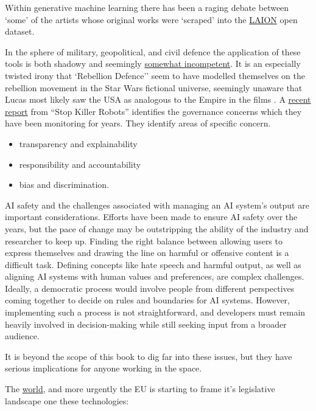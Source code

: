 Within generative machine learning there has been a raging debate between `some' of the artists whose original works were `scraped' into the \href{https://laion.ai/}{LAION} open dataset. \par
In the sphere of military, geopolitical, and civil defence the application of these tools is both shadowy and seemingly \href{https://www.vox.com/recode/23507236/inside-disruption-rebellion-defense-washington-connected-military-tech-startup}{somewhat incompetent}. It is an especially twisted irony that `Rebellion Defence'' seem to have modelled themselves on the rebellion movement in the Star Wars fictional universe, seemingly unaware that Lucas most likely saw the USA as analogous to the Empire in the films \cite{immerwahr202221}. A \href{https://www.stopkillerrobots.org/wp-content/uploads/2022/10/ADR-Artificial-intelligence-and-automated-decisions-Single-View.pdf}{recent report} from ``Stop Killer Robots'' identifies the governance concerns which they have been monitoring for years. They identify areas of specific concern.
\begin{itemize}
\item transparency and explainability \item responsibility and  accountability
\item bias and discrimination.
\end{itemize}
AI safety and the challenges associated with managing an AI system's output are important considerations. Efforts have been made to ensure AI safety over the years, but the pace of change may be outstripping the ability of the industry and researcher to keep up. Finding the right balance between allowing users to express themselves and drawing the line on harmful or offensive content is a difficult task. Defining concepts like hate speech and harmful output, as well as aligning AI systems with human values and preferences, are complex challenges. Ideally, a democratic process would involve people from different perspectives coming together to decide on rules and boundaries for AI systems. However, implementing such a process is not straightforward, and developers must remain heavily involved in decision-making while still seeking input from a broader audience.\par
It is beyond the scope of this book to dig far into these issues, but they have serious implications for anyone working in the space. \par 
The \href{https://www.holisticai.com/papers/the-state-of-ai-regulations-in-2023}{world}, and more urgently the EU is starting to frame it's legislative landscape one these technologies:
